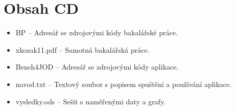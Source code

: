 \chapter{Obsah CD}
\begin{itemize}
  \item BP -- Adresář se zdrojovými kódy bakalářské práce.
  \item xkozak11.pdf -- Samotná bakalářská práce.
  \item Bench4JOD -- Adresář se zdrojovými kódy aplikace.
  \item navod.txt -- Textový soubor s popisem spuštění a používání aplikace. 
  \item vysledky.ods -- Sešit s naměřenými daty a grafy.
\end{itemize}
